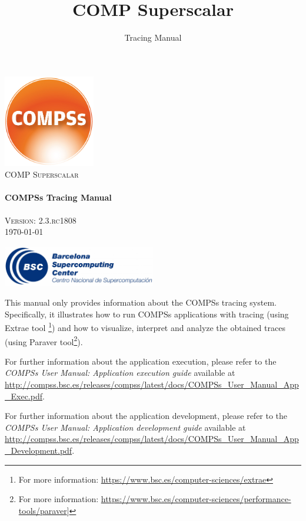 \documentclass[a4paper,12pt]{article}
\title{COMP Superscalar}
\author{Tracing Manual}
\def \compssversion {2.3.rc1808}
\begin{document}
  \hypersetup{pageanchor=false}
  \begin{titlepage} 
    \begin{center} 
      \includegraphics[width=0.3\textwidth]{./Figures/Logos/degradado-naranja-compss.jpg}~\\[1cm] 
      \textsc{\LARGE COMP Superscalar}\\[1.5cm] 
      
      \HRule \\[0.4cm] 
      { \huge \bfseries COMPSs Tracing Manual \\[0.4cm] }
      \HRule \\[1.5cm] 

      { \large \textsc{Version: \compssversion}} \\[0.3cm]
      { \large \today } 
      
      \vfill 
      \includegraphics[width=0.5\textwidth]{./Figures/bsc_280.jpg}~\\[1cm]
    \end{center} 
  \end{titlepage}
  \hypersetup{pageanchor=true}
  
  {
  
    This manual only provides information about the COMPSs tracing system. Specifically, it illustrates how to run COMPSs applications
    with tracing (using Extrae tool \footnote{For more information: \url{https://www.bsc.es/computer-sciences/extrae}}) and how to visualize, 
    interpret and analyze the obtained traces (using Paraver tool\footnote{For more information: \url{https://www.bsc.es/computer-sciences/performance-tools/paraver}]}).
    \newline

    For further information about the application execution, please refer to the \textit{COMPSs User Manual: Application execution
    guide} available at \url{http://compss.bsc.es/releases/compss/latest/docs/COMPSs_User_Manual_App_Exec.pdf}.
    \newline
    
    For further information about the application development, please refer to the \textit{COMPSs User Manual: Application development
    guide} available at \url{http://compss.bsc.es/releases/compss/latest/docs/COMPSs_User_Manual_App_Development.pdf}.

  }
  
\end{document}
